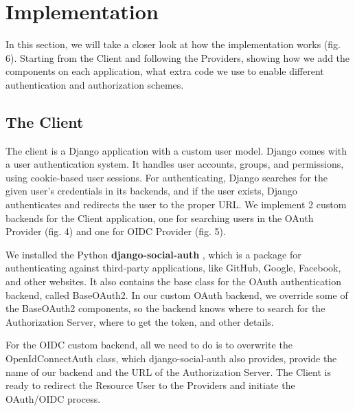 \section{Implementation}

In this section, we will take a closer look at how the implementation works (fig. 6). Starting from the Client and following the Providers, showing how we add the components on each application, what extra code we use to enable different authentication and authorization schemes. 


\subsection{The Client}

The client is a Django application with a custom user model. Django comes with a user authentication system. It handles user accounts, groups, and permissions, using cookie-based user sessions. For authenticating, Django searches for the given user's credentials in its backends, and if the user exists, Django authenticates and redirects the user to the proper URL. We implement 2 custom backends for the Client application, one for searching users in the OAuth Provider (fig. 4) and one for OIDC Provider (fig. 5).

We installed the Python \textbf{django-social-auth} \cite{djangosocial}, which is a package for authenticating against third-party applications, like GitHub, Google, Facebook, and other websites. It also contains the base class for the OAuth authentication backend, called BaseOAuth2. In our custom OAuth backend, we override some of the BaseOAuth2 components, so the backend knows where to search for the Authorization Server, where to get the token, and other details.

For the OIDC custom backend, all we need to do is to overwrite the OpenIdConnectAuth class, which django-social-auth also provides, provide the name of our backend and the URL of the Authorization Server. The Client is ready to redirect the Resource User to the Providers and initiate the OAuth/OIDC process.


